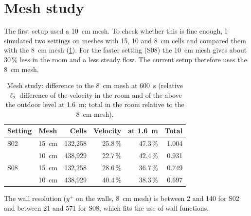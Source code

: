 \section{Mesh study}
The first setup used a 10~cm mesh. To check whether this is fine enough, I simulated two settings on meshes
with 15, 10 and 8~cm cells and compared them with the 8~cm mesh (\cref{tab:mesh}). For the faster setting
(S08) the 10~cm mesh gives about 30\,\% less \cotwo{} in the room and a less steady flow. The current setup
therefore uses the 8~cm mesh.

\begin{table}[h]
  \centering
  \caption{Mesh study: difference to the 8~cm mesh at 600~s (relative $\ell_2$ difference of the
  velocity in the room and of the \cotwo{} above the outdoor level at 1.6~m; total \cotwo{} in the room
  relative to the 8~cm mesh).}
  \label{tab:mesh}
  \begin{tabular}{llrrrr}
    \toprule
    Setting & Mesh & Cells & Velocity & \cotwo{} at 1.6~m & Total \cotwo{}\\
    \midrule
    S02 & 15~cm & 132,258 & 25.8\,\% & 47.3\,\% & 1.004\\
        & 10~cm & 438,929 & 22.7\,\% & 42.4\,\% & 0.931\\
    S08 & 15~cm & 132,258 & 28.6\,\% & 36.7\,\% & 0.749\\
        & 10~cm & 438,929 & 40.4\,\% & 38.3\,\% & 0.697\\
    \bottomrule
  \end{tabular}
\end{table}

The wall resolution ($y^+$ on the walls, 8~cm mesh) is between 2 and 140 for S02 and between 21 and 571 for
S08, which fits the use of wall functions. 
